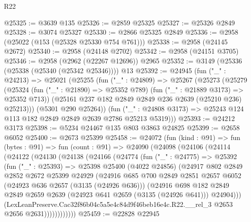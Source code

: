 \begin{lexlean}{R22}
\begin{coremodule}
@25325 := @3639 @135
@25326 := @2859 @25325
@25327 := @25326 @2849
@25328 := @3074 @25327
@25330 := @2866 @25325 @2849
@25336 := @2958 (@25022 (@153 (@25328 @25330 @754 @761)))
@25338 := @2958 (@24145 @2672)
@25340 := @2958 (@24148 @2702)
@25342 := @2958 (@24151 @3705)
@25346 := @2958 (@2962 (@22267 @12696)) @2965
@25352 := @3149 (@25336 (@25338 (@25340 (@25342 @25346)))) @13
@25392 := @24945
    (fun ("_" : @24213) =>
    @25021
      (@25255
        (fun ("_" : @24809) =>
        @25267
          (@25273
            (@25279
              (@25324 (fun ("_" : @21890) => @25352 @789) (fun ("_" : @21889 @3173) => @25352 @713))
              (@25161 @237 @182 @2849 @2849 @236 @2639 (@25210 @236) @25213)))
          (@5301 @290 @25264))
        (fun ("_" : @24808 @3173) => @25243 @124 @113 @182 @2849 @2849 @2639 @2786 @25213 @5319)))
@25393 := @24212 @3173
@25398 := @5234 @24467 @135 @803 @3863 @24825
@25399 := @2658 @6052
@25400 := @2673 @25399
@25458 := @24072
    (fun (kind : @91) =>
    fun (bytes : @91) =>
    fun (count : @91) =>
    @24090
      (@24098
        (@24106
          (@24114
            (@24122
              (@24130
                (@24138
                  (@24166
                    (@24774
                      (fun ("_" : @24775) =>
                      @25392
                        (fun ("_" : @25393) =>
                        @25398
                          @25400
                          (@4022 @24856)
                          (@24917
                            @802
                            @2849
                            @2852
                            @2672
                            @25399
                            @24929
                            (@24916
                              @685
                              @700
                              @2849
                              @2851
                              @2657
                              @6052
                              (@24923 @636 @2657 (@3135 (@24926 @636)))
                              (@24916
                                @698
                                @182
                                @2849
                                @2849
                                @2659
                                @2639
                                (@24923 @641 @2659 (@3135 (@24926 @641)))
                                @24904)))
                          (LexLeanPreserve.Cac32f86b04c5a5e4c84d9f46beb16e4c.R22.__rel_3
                            @2653
                            @2656
                            @2631))))))))))))
@25459 := @22828 @22945

\end{coremodule}
\end{lexlean}
